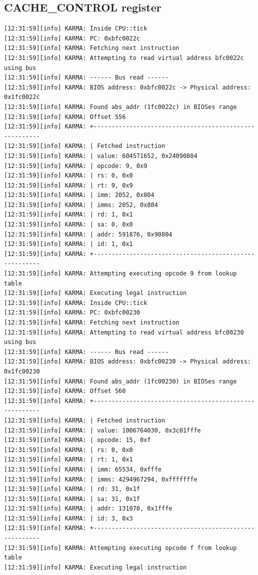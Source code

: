 \documentclass[a4paper]{article}
\begin{document}
\subsection{CACHE\_CONTROL register}
\begin{verbatim}
[12:31:59][info] KARMA: Inside CPU::tick
[12:31:59][info] KARMA: PC: 0xbfc0022c
[12:31:59][info] KARMA: Fetching next instruction
[12:31:59][info] KARMA: Attempting to read virtual address bfc0022c using bus
[12:31:59][info] KARMA: ------ Bus read ------
[12:31:59][info] KARMA: BIOS address: 0xbfc0022c -> Physical address: 0x1fc0022c
[12:31:59][info] KARMA: Found abs_addr (1fc0022c) in BIOSes range
[12:31:59][info] KARMA: Offset 556
[12:31:59][info] KARMA: +-------------------------------------------------------
[12:31:59][info] KARMA: | Fetched instruction 
[12:31:59][info] KARMA: | value: 604571652, 0x24090804
[12:31:59][info] KARMA: | opcode: 9, 0x9
[12:31:59][info] KARMA: | rs: 0, 0x0
[12:31:59][info] KARMA: | rt: 9, 0x9
[12:31:59][info] KARMA: | imm: 2052, 0x804
[12:31:59][info] KARMA: | imms: 2052, 0x804
[12:31:59][info] KARMA: | rd: 1, 0x1
[12:31:59][info] KARMA: | sa: 0, 0x0
[12:31:59][info] KARMA: | addr: 591876, 0x90804
[12:31:59][info] KARMA: | id: 1, 0x1
[12:31:59][info] KARMA: +-------------------------------------------------------
[12:31:59][info] KARMA: Attempting executing opcode 9 from lookup table
[12:31:59][info] KARMA: Executing legal instruction
[12:31:59][info] KARMA: Inside CPU::tick
[12:31:59][info] KARMA: PC: 0xbfc00230
[12:31:59][info] KARMA: Fetching next instruction
[12:31:59][info] KARMA: Attempting to read virtual address bfc00230 using bus
[12:31:59][info] KARMA: ------ Bus read ------
[12:31:59][info] KARMA: BIOS address: 0xbfc00230 -> Physical address: 0x1fc00230
[12:31:59][info] KARMA: Found abs_addr (1fc00230) in BIOSes range
[12:31:59][info] KARMA: Offset 560
[12:31:59][info] KARMA: +-------------------------------------------------------
[12:31:59][info] KARMA: | Fetched instruction 
[12:31:59][info] KARMA: | value: 1006764030, 0x3c01fffe
[12:31:59][info] KARMA: | opcode: 15, 0xf
[12:31:59][info] KARMA: | rs: 0, 0x0
[12:31:59][info] KARMA: | rt: 1, 0x1
[12:31:59][info] KARMA: | imm: 65534, 0xfffe
[12:31:59][info] KARMA: | imms: 4294967294, 0xfffffffe
[12:31:59][info] KARMA: | rd: 31, 0x1f
[12:31:59][info] KARMA: | sa: 31, 0x1f
[12:31:59][info] KARMA: | addr: 131070, 0x1fffe
[12:31:59][info] KARMA: | id: 3, 0x3
[12:31:59][info] KARMA: +-------------------------------------------------------
[12:31:59][info] KARMA: Attempting executing opcode f from lookup table
[12:31:59][info] KARMA: Executing legal instruction

\end{verbatim}
\end{document}
